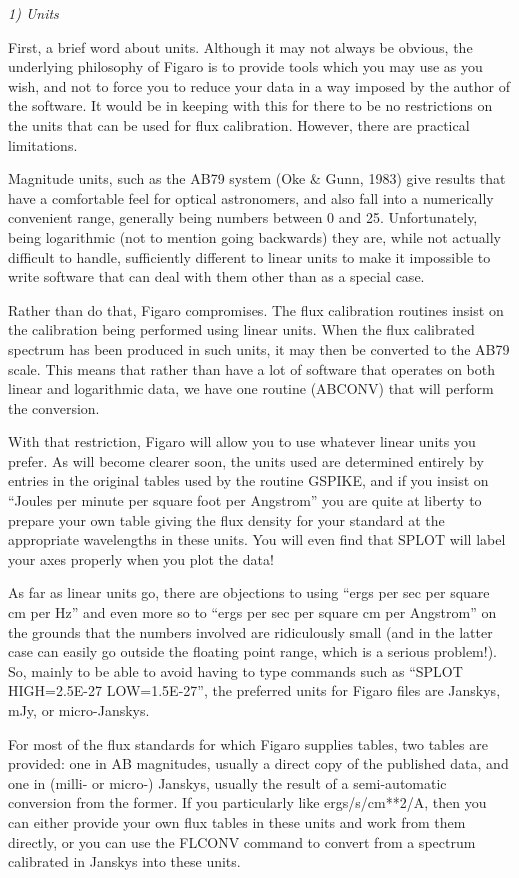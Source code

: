 {\it 1) Units}

First, a brief word about units.  Although it may not always be
obvious, the underlying philosophy of Figaro is to provide tools which 
you may use as you wish, and not to force you to reduce your data in
a way imposed by the author of the software.  It would be in keeping with
this for there to be no restrictions on the units that can be used for
flux calibration.  However, there are practical limitations.  

Magnitude units, such as the
AB79 system (Oke \& Gunn, 1983) give results that have a comfortable feel
for optical astronomers, and also fall into a numerically convenient range,
generally being numbers between 0 and 25.  Unfortunately, being logarithmic
(not to mention going backwards) they are, while not actually difficult to
handle, sufficiently different to linear units to make it impossible to
write software that can deal with them other than as a special case.

Rather than do that, Figaro compromises.  The flux calibration routines
insist on the calibration being performed using linear units.  When the
flux calibrated spectrum has been produced in such units, it may then be
converted to the AB79 scale.  This means that rather than have a lot of
software that operates on both linear and logarithmic data, we have one
routine (ABCONV) that will perform the conversion.

With that restriction, Figaro will allow you to use whatever linear
units you prefer.  As will become clearer soon, the units used are determined
entirely by entries in the original tables used by the routine GSPIKE, and
if you insist on ``Joules per minute per square foot per Angstrom'' you are
quite at liberty to prepare your own table giving the flux density for your
standard at the appropriate wavelengths in these units.  You will even find
that SPLOT will label your axes properly when you plot the data!

As far as linear units go, there are objections to using ``ergs per
sec per square cm per Hz'' and even more so to ``ergs per sec per square cm
per Angstrom'' on the grounds that the numbers involved are ridiculously
small (and in the latter case can easily go outside the floating point
range, which is a serious problem!).  So, mainly to be able to
avoid having to type commands such as ``SPLOT HIGH=2.5E-27 LOW=1.5E-27'',
the preferred units for Figaro files are Janskys, mJy, or micro-Janskys.

For most of the flux standards for which Figaro supplies tables, two
tables are provided: one in AB magnitudes, usually a direct copy of the
published data, and one in (milli- or micro-) Janskys, usually the result of
a semi-automatic conversion from the former.  If you particularly like
ergs/s/cm**2/A, then you can either provide your own flux tables in these
units and work from them directly, or you can use the FLCONV command to
convert from a spectrum calibrated in Janskys into these units.


